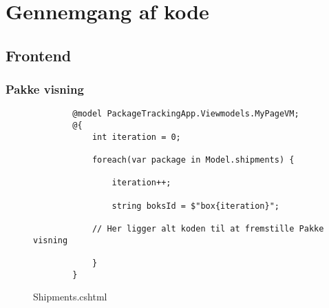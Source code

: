 \chapter{Gennemgang af kode}
\section{Frontend}
\subsection{Pakke visning}
\begin{figure}[!h]
    \begin{verbatim}
        @model PackageTrackingApp.Viewmodels.MyPageVM;
        @{
            int iteration = 0;

            foreach(var package in Model.shipments) {

                iteration++;

                string boksId = $"box{iteration}";
             
            // Her ligger alt koden til at fremstille Pakke visning
                
            }
        }
    \end{verbatim}
\caption{Shipments.cshtml}

\label{code:Shipments.cs}
\end{figure}

